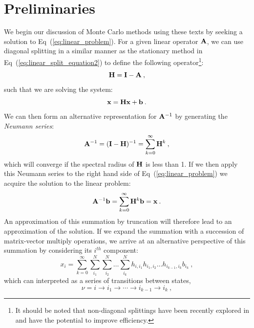 \section{Preliminaries}
\label{sec:mc_preliminaries}
We begin our discussion of Monte Carlo methods using these texts by
seeking a solution to Eq~(\ref{eq:linear_problem}). For a given linear
operator $\mathbf{A}$, we can use diagonal splitting in a similar manner
as the stationary method in Eq~(\ref{eq:linear_split_equation2}) to
define the following operator\footnote{It should be noted that
  non-diagonal splittings have been recently explored in
  \citep{srinivasan_monte_2010} and have the potential to improve
  efficiency.}:
\begin{equation}
  \mathbf{H} = \mathbf{I} - \mathbf{A}\:,
  \label{eq:linear_mc_iteration_matrix}
\end{equation}
such that we are solving the system:
\begin{equation}
  \mathbf{x} = \mathbf{H} \mathbf{x} + \mathbf{b}\:.
  \label{eq:richardson_split}
\end{equation}
We can then form an alternative representation for $\mathbf{A}^{-1}$ by
generating the \textit{Neumann series}:
\begin{equation}
  \mathbf{A}^{-1} = (\mathbf{I}-\mathbf{H})^{-1} = \sum_{k=0}^{\infty} \mathbf{H}^k\:,
  \label{eq:neumann_series}
\end{equation}
which will converge if the spectral radius of $\mathbf{H}$ is less than
1. If we then apply this Neumann series to the right hand side of
Eq~(\ref{eq:linear_problem}) we acquire the solution to the linear
problem:
\begin{equation}
  \mathbf{A}^{-1}\mathbf{b} = \sum_{k=0}^{\infty} \mathbf{H}^k\mathbf{b} = \mathbf{x}\:.
  \label{eq:neumann_solution}
\end{equation}
An approximation of this summation by truncation will therefore lead
to an approximation of the solution. If we expand the summation with a
succession of matrix-vector multiply operations, we arrive at an
alternative perspective of this summation by considering its $i^{th}$
component:
\begin{equation}
  x_i = \sum_{k=0}^{\infty}\sum_{i_1}^{N}\sum_{i_2}^{N}\ldots
  \sum_{i_k}^{N}h_{i,i_1}h_{i_1,i_2}\ldots h_{i_{k-1},i_k}b_{i_k}\:,
  \label{eq:expanded_neumann_solution}
\end{equation}
which can interpreted as a series of transitions between states,
\begin{equation}
 \nu = i \rightarrow i_1 \rightarrow \cdots \rightarrow i_{k-1}
 \rightarrow i_{k}\:,
  \label{eq:mc_walk_permutation}
\end{equation}
